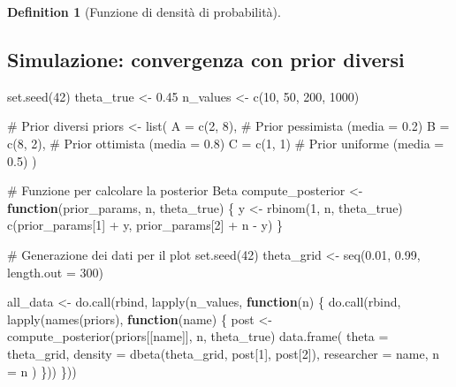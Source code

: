 \documentclass[
  letterpaper,
  DIV=11,
  numbers=noendperiod,
  oneside]{scrreprt}
\newenvironment{Shaded}{\begin{snugshade}}{\end{snugshade}}
\newcommand{\AttributeTok}[1]{\textcolor[rgb]{0.40,0.45,0.13}{#1}}
\newcommand{\CommentTok}[1]{\textcolor[rgb]{0.37,0.37,0.37}{#1}}
\newcommand{\ControlFlowTok}[1]{\textcolor[rgb]{0.00,0.23,0.31}{\textbf{#1}}}
\newcommand{\DecValTok}[1]{\textcolor[rgb]{0.68,0.00,0.00}{#1}}
\newcommand{\FloatTok}[1]{\textcolor[rgb]{0.68,0.00,0.00}{#1}}
\newcommand{\FunctionTok}[1]{\textcolor[rgb]{0.28,0.35,0.67}{#1}}
\newcommand{\NormalTok}[1]{\textcolor[rgb]{0.00,0.23,0.31}{#1}}
\newcommand{\OtherTok}[1]{\textcolor[rgb]{0.00,0.23,0.31}{#1}}
\newcommand{\SpecialCharTok}[1]{\textcolor[rgb]{0.37,0.37,0.37}{#1}}
\theoremstyle{definition}
\theoremstyle{plain}
\theoremstyle{definition}
\newtheorem{definition}{Definition}[chapter]
\theoremstyle{remark}
\begin{document}
\begin{definition}[Funzione di densità di
probabilità]
\subsection{Simulazione: convergenza con prior
diversi}\label{simulazione-convergenza-con-prior-diversi}

\begin{Shaded}
\begin{Highlighting}[]
\FunctionTok{set.seed}\NormalTok{(}\DecValTok{42}\NormalTok{)}
\NormalTok{theta\_true }\OtherTok{\textless{}{-}} \FloatTok{0.45}
\NormalTok{n\_values }\OtherTok{\textless{}{-}} \FunctionTok{c}\NormalTok{(}\DecValTok{10}\NormalTok{, }\DecValTok{50}\NormalTok{, }\DecValTok{200}\NormalTok{, }\DecValTok{1000}\NormalTok{)}

\CommentTok{\# Prior diversi}
\NormalTok{priors }\OtherTok{\textless{}{-}} \FunctionTok{list}\NormalTok{(}
  \AttributeTok{A =} \FunctionTok{c}\NormalTok{(}\DecValTok{2}\NormalTok{, }\DecValTok{8}\NormalTok{),   }\CommentTok{\# Prior pessimista (media = 0.2)}
  \AttributeTok{B =} \FunctionTok{c}\NormalTok{(}\DecValTok{8}\NormalTok{, }\DecValTok{2}\NormalTok{),   }\CommentTok{\# Prior ottimista (media = 0.8)}
  \AttributeTok{C =} \FunctionTok{c}\NormalTok{(}\DecValTok{1}\NormalTok{, }\DecValTok{1}\NormalTok{)    }\CommentTok{\# Prior uniforme (media = 0.5)}
\NormalTok{)}

\CommentTok{\# Funzione per calcolare la posterior Beta}
\NormalTok{compute\_posterior }\OtherTok{\textless{}{-}} \ControlFlowTok{function}\NormalTok{(prior\_params, n, theta\_true) \{}
\NormalTok{  y }\OtherTok{\textless{}{-}} \FunctionTok{rbinom}\NormalTok{(}\DecValTok{1}\NormalTok{, n, theta\_true)}
  \FunctionTok{c}\NormalTok{(prior\_params[}\DecValTok{1}\NormalTok{] }\SpecialCharTok{+}\NormalTok{ y, prior\_params[}\DecValTok{2}\NormalTok{] }\SpecialCharTok{+}\NormalTok{ n }\SpecialCharTok{{-}}\NormalTok{ y)}
\NormalTok{\}}

\CommentTok{\# Generazione dei dati per il plot}
\FunctionTok{set.seed}\NormalTok{(}\DecValTok{42}\NormalTok{)}
\NormalTok{theta\_grid }\OtherTok{\textless{}{-}} \FunctionTok{seq}\NormalTok{(}\FloatTok{0.01}\NormalTok{, }\FloatTok{0.99}\NormalTok{, }\AttributeTok{length.out =} \DecValTok{300}\NormalTok{)}

\NormalTok{all\_data }\OtherTok{\textless{}{-}} \FunctionTok{do.call}\NormalTok{(rbind, }\FunctionTok{lapply}\NormalTok{(n\_values, }\ControlFlowTok{function}\NormalTok{(n) \{}
  \FunctionTok{do.call}\NormalTok{(rbind, }\FunctionTok{lapply}\NormalTok{(}\FunctionTok{names}\NormalTok{(priors), }\ControlFlowTok{function}\NormalTok{(name) \{}
\NormalTok{    post }\OtherTok{\textless{}{-}} \FunctionTok{compute\_posterior}\NormalTok{(priors[[name]], n, theta\_true)}
    \FunctionTok{data.frame}\NormalTok{(}
      \AttributeTok{theta =}\NormalTok{ theta\_grid,}
      \AttributeTok{density =} \FunctionTok{dbeta}\NormalTok{(theta\_grid, post[}\DecValTok{1}\NormalTok{], post[}\DecValTok{2}\NormalTok{]),}
      \AttributeTok{researcher =}\NormalTok{ name,}
      \AttributeTok{n =}\NormalTok{ n}
\NormalTok{    )}
\NormalTok{  \}))}
\NormalTok{\}))}


\end{Highlighting}
\end{Shaded}
\end{definition}
\end{document}
